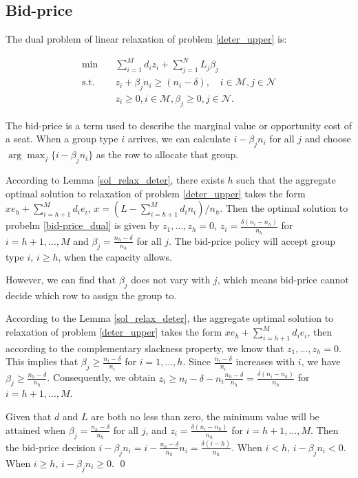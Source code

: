 \subsection{Bid-price}
The dual problem of linear relaxation of problem \eqref{deter_upper} is:

\begin{equation}\label{bid-price_dual}
  \begin{aligned}
  \min \quad & \sum_{i=1}^{M} d_i z_i + \sum_{j= 1}^{N} L_j \beta_{j} \\
  \text {s.t.} \quad & z_{i} + \beta_j n_i \geq (n_i-\delta), \quad i \in \mathcal{M}, j \in \mathcal{N} \\
  & z_{i} \geq 0, i \in \mathcal{M}, \beta_{j} \geq 0, j \in \mathcal{N}.
  \end{aligned}
\end{equation}

The bid-price is a term used to describe the marginal value or opportunity cost of a seat. When a group type $i$ arrives, we can calculate $i -\beta_{j} n_i$ for all $j$ and choose $\arg \max_{j} \{i -\beta_{j} n_i\}$ as the row to allocate that group.

\begin{lem}
According to Lemma \ref{sol_relax_deter}, there exists $h$ such that the aggregate optimal solution to relaxation of problem \eqref{deter_upper} takes the form $x e_{h} + \sum_{i=h+1} ^{M} d_{i} e_{i}$, $x = (L- \sum_{i = h+1}^{M} {d_i n_i})/ n_h$. Then the optimal solution to probelm \eqref{bid-price_dual} is given by $z_1 ,\ldots, z_h =0$, $z_{i} = \frac{\delta(n_i-n_h)}{n_h}$ for $i = h+1, \ldots, M$ and $\beta_j = \frac{n_h - \delta}{n_h}$ for all $j$. The bid-price policy will accept group type $i$, $i \geq h$, when the capacity allows.
\end{lem}

However, we can find that $\beta_{j}$ does not vary with $j$, which means bid-price cannot decide which row to assign the group to.

\begin{pf}
According to the Lemma \ref{sol_relax_deter}, the aggregate optimal solution to relaxation of problem \eqref{deter_upper} takes the form $x e_{h} + \sum_{i=h+1} ^{M} d_{i} e_{i}$, then according to the complementary slackness property, we know that $z_1, \ldots, z_h = 0$. This implies that $\beta_j \geq \frac{n_i - \delta}{n_i}$ for $i = 1,\ldots, h$. Since $\frac{n_i - \delta}{n_i}$ increases with $i$, we have $\beta_j \geq \frac{n_h - \delta}{n_h}$. Consequently, we obtain $z_{i} \geq n_i - \delta - n_i \frac{n_h - \delta}{n_h} = \frac{\delta(n_i-n_h)}{n_h}$ for $i = h+1, \ldots, M$.

Given that $d$ and $L$ are both no less than zero, the minimum value will be attained when $\beta_j = \frac{n_h - \delta}{n_h}$ for all $j$, and $z_i = \frac{\delta(n_i-n_h)}{n_h}$ for $i = h+1, \ldots, M$. Then the bid-price decision $i -\beta_{j} n_i = i - \frac{n_h -\delta}{n_h} n_i = \frac{\delta (i-h)}{n_h}$. When $i < h$, $i -\beta_{j} n_i <0$. When $i \geq h$, $i -\beta_{j} n_i \geq 0$. \qed
\end{pf}

